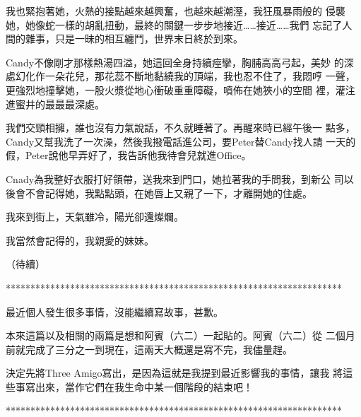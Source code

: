 我也緊抱著她，火熱的接點越來越興奮，也越來越潮溼，我狂風暴雨般的
侵襲她，她像蛇一樣的胡亂扭動，最終的關鍵一步步地接近……接近……我們
忘記了人間的雜事，只是一昧的相互纏鬥，世界末日終於到來。

Candy不像剛才那樣熱湯四溢，她這回全身持續痙攣，胸脯高高弓起，美妙
的深處幻化作一朵花兒，那花蕊不斷地黏繞我的頂端，我也忍不住了，我悶哼
一聲，更強烈地撞擊她，一股火漿從地心衝破重重障礙，噴佈在她狹小的空間
裡，灌注進蜜井的最最最深處。

我們交頸相擁，誰也沒有力氣說話，不久就睡著了。再醒來時已經午後一
點多，Candy又幫我洗了一次澡，然後我撥電話進公司，要Peter替Candy找人請
一天的假，Peter說他早弄好了，我告訴他我待會兒就進Office。

Cnady為我整好衣服打好領帶，送我來到門口，她拉著我的手問我，到新公
司以後會不會記得她，我點點頭，在她唇上又親了一下，才離開她的住處。

我來到街上，天氣雖冷，陽光卻還燦爛。

我當然會記得的，我親愛的妹妹。

（待續）


********************************************************************

最近個人發生很多事情，沒能繼續寫故事，甚歉。

本來這篇以及相關的兩篇是想和阿賓（六二）一起貼的。阿賓（六二）從
二個月前就完成了三分之一到現在，這兩天大概還是寫不完，我儘量趕。

決定先將Three Amigo寫出，是因為這就是我提到最近影響我的事情，讓我
將這些事寫出來，當作它們在我生命中某一個階段的結束吧！

********************************************************************










